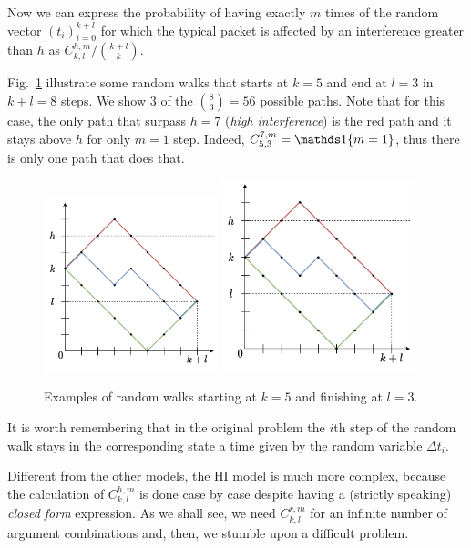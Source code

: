 Now we can express the probability of having exactly $m$ times of the random vector $(t_i)_{i=0}^{k+l}$ for which the typical packet is affected by an interference greater than $h$ as $C_{k,l}^{h,m}/\binom{k+l}{k}$.

Fig.~\ref{fig:random_walk} illustrate some random walks that starts at $k=5$ and end at $l=3$ in $k+l=8$ steps. We show $3$ of the $\binom{8}{3} = 56$ possible paths.
%
Note that for this case, the only path that surpass $h=7$ (\textit{high interference}) is the red path and it stays above $h$ for only $m=1$ step.
%
Indeed, $C_{5,3}^{7,m} = \ind\{m=1\}$, thus there is only one path that does that.
\begin{figure}[htb]
\centering
    \if{}
        \includegraphics[width=0.45\textwidth]{Figures/Ch5_RandomWalk.pdf}
    \else
        \includegraphics[draft, width=0.5\textwidth]{Figures/Ch5_RandomWalk.pdf}
    \fi
	\caption{Examples of random walks starting at $k=5$ and finishing at $l = 3$.}
	\label{fig:random_walk}
\end{figure}
%
It is worth remembering that in the original problem the $i$th step of the random walk stays in the corresponding state a time given by the random variable $\Delta t_i$.

Different from the other models, the HI model is much more complex, because the calculation of $C_{k,l}^{h,m}$ is done case by case despite having a (strictly speaking) \textit{closed form} expression.
%
As we shall see, we need $C_{k,l}^{r,m}$ for an infinite number of argument combinations and, then, we stumble upon a difficult problem.

